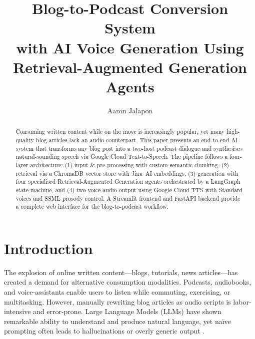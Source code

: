 \documentclass[sigconf,natbib=false]{acmart}   %
\title{Blog-to-Podcast Conversion System \\[1ex]
       with AI Voice Generation Using Retrieval-Augmented Generation Agents}
\author{Aaron Jalapon}
\affiliation{%
  \institution{University of Mindanao}
  \city{Davao City}
  \country{Philippines}}
\begin{document}
\begin{abstract}
   Consuming written content while on the move is increasingly popular, yet many
   high-quality blog articles lack an audio counterpart.  This paper presents an
   end-to-end AI system that transforms any blog post into a two-host podcast
   dialogue and synthesises natural-sounding speech via Google Cloud
   Text-to-Speech.  The pipeline follows a four-layer architecture:
   (1) input \& pre-processing with custom semantic chunking, (2) retrieval
   via a ChromaDB vector store with Jina~AI embeddings, (3) generation with
   four specialised Retrieval-Augmented Generation agents orchestrated by a
   LangGraph state machine, and (4) two-voice audio output using
   Google Cloud TTS with Standard voices and SSML prosody control.  A
   Streamlit frontend and FastAPI backend provide a complete web interface for the
   blog-to-podcast workflow.
\end{abstract}

\maketitle                                   %

\section{Introduction}\label{sec:intro}
The explosion of online written content---blogs, tutorials, news articles---has created a demand for alternative consumption modalities.  Podcasts, audiobooks, and voice-assistants enable users to listen while commuting, exercising, or multitasking.  However, manually rewriting blog articles as audio scripts is labor-intensive and error-prone.  Large Language Models (LLMs) have shown remarkable ability to understand and produce natural language, yet naïve prompting often leads to hallucinations or overly generic output \cite{Lewis2020RAG}.  
\end{document}
